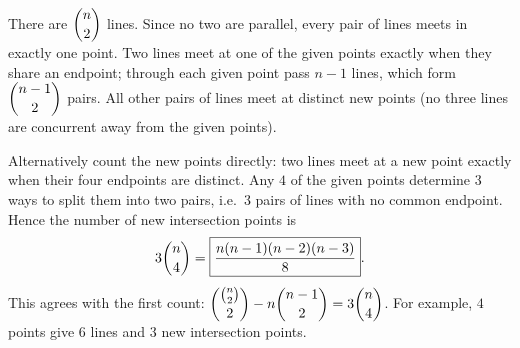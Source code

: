 There are $\dbinom n2$ lines. Since no two are parallel, every pair of lines meets in exactly one point. Two lines meet at one of the given points exactly when they share an endpoint; through each given point pass $n-1$ lines, which form $\dbinom{n-1}2$ pairs. All other pairs of lines meet at distinct new points (no three lines are concurrent away from the given points).

Alternatively count the new points directly: two lines meet at a new point exactly when their four endpoints are distinct. Any $4$ of the given points determine $3$ ways to split them into two pairs, i.e.\ $3$ pairs of lines with no common endpoint. Hence the number of new intersection points is
\[
3\dbinom n4=\boxed{\dfrac{n(n-1)(n-2)(n-3)}{8}}.
\]
This agrees with the first count: $\dbinom{\binom n2}{2}-n\dbinom{n-1}{2}=3\dbinom n4$. For example, $4$ points give $6$ lines and $3$ new intersection points.
